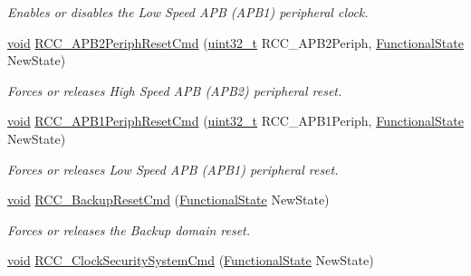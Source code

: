\begin{DoxyCompactItemize}
\begin{DoxyCompactList}\small\item\em Enables or disables the Low Speed A\+PB (A\+P\+B1) peripheral clock. \end{DoxyCompactList}\item 
\hyperlink{usb__devapi_8h_afabf60e7f57651d6d595a02c75f07cd0}{void} \hyperlink{group___r_c_c___private___functions_gad94553850ac07106a27ee85fec37efdf}{R\+C\+C\+\_\+\+A\+P\+B2\+Periph\+Reset\+Cmd} (\hyperlink{_p_e___types_8h_a33594304e786b158f3fb30289278f5af}{uint32\+\_\+t} R\+C\+C\+\_\+\+A\+P\+B2\+Periph, \hyperlink{agilefox_2library_2inc_2stm32f10x__type_8h_ac9a7e9a35d2513ec15c3b537aaa4fba1}{Functional\+State} New\+State)
\begin{DoxyCompactList}\small\item\em Forces or releases High Speed A\+PB (A\+P\+B2) peripheral reset. \end{DoxyCompactList}\item 
\hyperlink{usb__devapi_8h_afabf60e7f57651d6d595a02c75f07cd0}{void} \hyperlink{group___r_c_c___private___functions_gab197ae4369c10b92640a733b40ed2801}{R\+C\+C\+\_\+\+A\+P\+B1\+Periph\+Reset\+Cmd} (\hyperlink{_p_e___types_8h_a33594304e786b158f3fb30289278f5af}{uint32\+\_\+t} R\+C\+C\+\_\+\+A\+P\+B1\+Periph, \hyperlink{agilefox_2library_2inc_2stm32f10x__type_8h_ac9a7e9a35d2513ec15c3b537aaa4fba1}{Functional\+State} New\+State)
\begin{DoxyCompactList}\small\item\em Forces or releases Low Speed A\+PB (A\+P\+B1) peripheral reset. \end{DoxyCompactList}\item 
\hyperlink{usb__devapi_8h_afabf60e7f57651d6d595a02c75f07cd0}{void} \hyperlink{group___r_c_c___private___functions_ga636c3b72f35391e67f12a551b15fa54a}{R\+C\+C\+\_\+\+Backup\+Reset\+Cmd} (\hyperlink{agilefox_2library_2inc_2stm32f10x__type_8h_ac9a7e9a35d2513ec15c3b537aaa4fba1}{Functional\+State} New\+State)
\begin{DoxyCompactList}\small\item\em Forces or releases the Backup domain reset. \end{DoxyCompactList}\item 
\hyperlink{usb__devapi_8h_afabf60e7f57651d6d595a02c75f07cd0}{void} \hyperlink{group___r_c_c___private___functions_ga0ff1fd7b9a8a49cdda11b7d7261c3494}{R\+C\+C\+\_\+\+Clock\+Security\+System\+Cmd} (\hyperlink{agilefox_2library_2inc_2stm32f10x__type_8h_ac9a7e9a35d2513ec15c3b537aaa4fba1}{Functional\+State} New\+State)

\end{DoxyCompactItemize}

